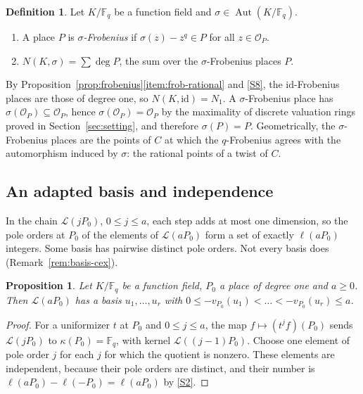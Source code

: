 \documentclass[11pt]{amsbook}
\theoremstyle{plain}
\newtheorem{proposition}[theorem]{Proposition}
\theoremstyle{definition}
\newtheorem{definition}[theorem]{Definition}
\theoremstyle{remark}
\numberwithin{equation}{section}
\numberwithin{figure}{chapter}
\numberwithin{table}{chapter}
\newcommand{\F}{\mathbb{F}}
\DeclareMathOperator{\Aut}{Aut}
\newcommand{\calL}{\mathcal{L}}
\newcommand{\calO}{\mathcal{O}}
\begin{document}
\begin{definition}\label{def:frob-place}
Let $K/\F_q$ be a function field and $\sigma\in\Aut(K/\F_q)$.
\begin{enumerate}
\item A place $P$ is \emph{$\sigma$-Frobenius} if
$\sigma(z)-z^q\in P$ for all $z\in\calO_P$.
\item $N(K,\sigma)=\sum\deg P$, the sum over the
$\sigma$-Frobenius places $P$.
\end{enumerate}
\end{definition}

By Proposition~\ref{prop:frobenius}\eqref{item:frob-rational} and
\ref{S8}, the $\mathrm{id}$-Frobenius places are those of degree
one, so $N(K,\mathrm{id})=N_1$. A $\sigma$-Frobenius place has
$\sigma(\calO_P)\subseteq\calO_P$, hence $\sigma(\calO_P)=\calO_P$
by the maximality of discrete valuation rings proved in
Section~\ref{sec:setting}, and therefore $\sigma(P)=P$.
Geometrically, the $\sigma$-Frobenius places are the points of $C$
at which the $q$-Frobenius agrees with the automorphism induced by
$\sigma$: the rational points of a twist of $C$.

\subsection{An adapted basis and independence}

In the chain $\calL(jP_0)$, $0\le j\le a$, each step adds at most
one dimension, so the pole orders at $P_0$ of the elements of
$\calL(aP_0)$ form a set of exactly $\ell(aP_0)$ integers. Some
basis has pairwise distinct pole orders. Not every basis does
(Remark~\ref{rem:basis-cex}).

\begin{proposition}\label{prop:adapted-basis}
Let $K/\F_q$ be a function field, $P_0$ a place of degree one and
$a\ge0$. Then $\calL(aP_0)$ has a basis $u_1,\dots,u_r$ with
$0\le-v_{P_0}(u_1)<\dots<-v_{P_0}(u_r)\le a$.
\end{proposition}

\begin{proof}
For a uniformizer $t$ at $P_0$ and $0\le j\le a$, the map
$f\mapsto(t^jf)(P_0)$ sends $\calL(jP_0)$ to $\kappa(P_0)=\F_q$,
with kernel $\calL((j-1)P_0)$. Choose one element of pole order $j$
for each $j$ for which the quotient is nonzero. These elements are
independent, because their pole orders are distinct, and their
number is $\ell(aP_0)-\ell(-P_0)=\ell(aP_0)$ by \ref{S2}.
\end{proof}
\end{document}
